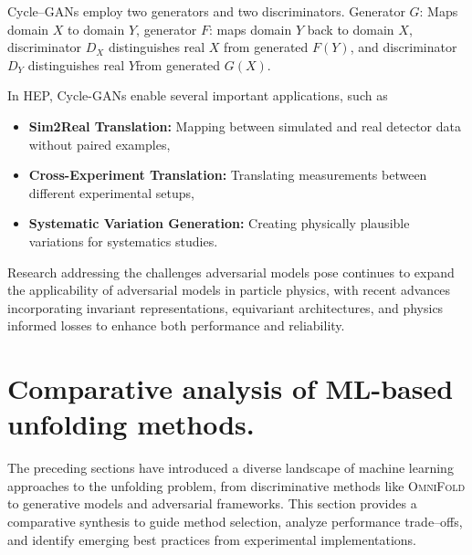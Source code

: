        Cycle--GANs employ two generators and two discriminators.
        Generator \(G\): Maps domain \(X\) to domain \(Y\), generator \(F\): maps domain \(Y\) back to domain \(X\), discriminator \(D_X\) distinguishes real \(X\) from generated \(F(Y)\), and discriminator \(D_Y\) distinguishes real \(Y\)from generated \(G(X)\).
        

        In HEP, Cycle-GANs enable several important applications, such as
        \begin{itemize}
            \item \textbf{Sim2Real Translation:} Mapping between simulated and real detector data without paired examples,
            \item \textbf{Cross-Experiment Translation:} Translating measurements between different experimental setups,
            \item \textbf{Systematic Variation Generation:} Creating physically plausible variations for systematics studies.
        \end{itemize}
    Research addressing the challenges adversarial models pose continues to expand the applicability of adversarial models in particle physics, with recent advances incorporating invariant representations, equivariant architectures, and physics informed losses to enhance both performance and reliability.
    
\section{Comparative analysis of ML-based unfolding methods.}
    The preceding sections have introduced a diverse landscape of machine learning approaches to the unfolding problem, from discriminative methods like \textsc{OmniFold} to generative models and adversarial frameworks.
    This section provides a comparative synthesis to guide method selection, analyze performance trade--offs, and identify emerging best practices from experimental implementations.
